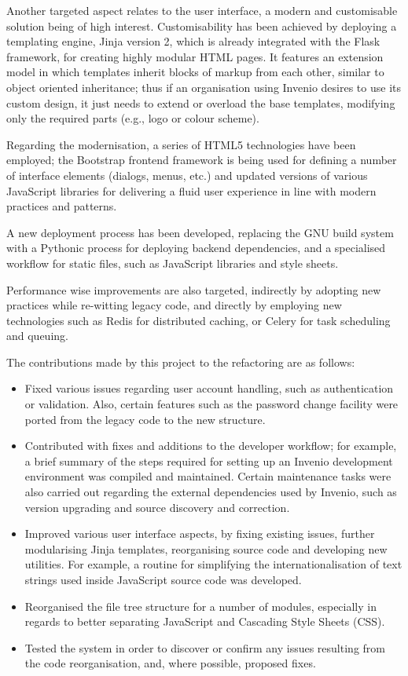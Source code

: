 Another targeted aspect relates to the user interface, a modern and
customisable solution being of high interest. Customisability has been achieved
by deploying a templating engine, Jinja version 2, which is already integrated
with the Flask framework, for creating highly modular HTML pages. It features
an extension model in which templates inherit blocks of markup from each other,
similar to object oriented inheritance; thus if an organisation using Invenio
desires to use its custom design, it just needs to extend or overload the base
templates, modifying only the required parts (e.g., logo or colour scheme).

Regarding the modernisation, a series of HTML5 technologies have been employed;
the Bootstrap \cite{ref:bootstrap} frontend framework is being used for
defining a number of interface elements (dialogs, menus, etc.) and updated
versions of various JavaScript libraries for delivering a fluid user experience
in line with modern practices and patterns.

A new deployment process has been developed, replacing the GNU build system
with a Pythonic process for deploying backend dependencies, and a specialised
workflow for static files, such as JavaScript libraries and style sheets.

Performance wise improvements are also targeted, indirectly by adopting new
practices while re-witting legacy code, and directly by employing new
technologies such as Redis \cite{ref:redis} for distributed caching, or Celery
\cite{ref:celery} for task scheduling and queuing.

The contributions made by this project to the refactoring are as follows:
\begin{itemize}
  \item Fixed various issues regarding user account handling, such as
        authentication or validation. Also, certain features such as the
        password change facility were ported from the legacy code to the new
        structure.
  \item Contributed with fixes and additions to the developer workflow; for
        example, a brief summary of the steps required for setting up an Invenio
        development environment was compiled and maintained. Certain
        maintenance tasks were also carried out regarding the external
        dependencies used by Invenio, such as version upgrading and source
        discovery and correction.
  \item Improved various user interface aspects, by fixing existing issues,
        further modularising Jinja templates, reorganising source code and
        developing new utilities. For example, a routine for simplifying the
        internationalisation of text strings used inside JavaScript source code
        was developed.
  \item Reorganised the file tree structure for a number of modules, especially
        in regards to better separating JavaScript and Cascading Style Sheets
        (CSS).
  \item Tested the system in order to discover or confirm any issues resulting
        from the code reorganisation, and, where possible, proposed fixes.
\end{itemize}

